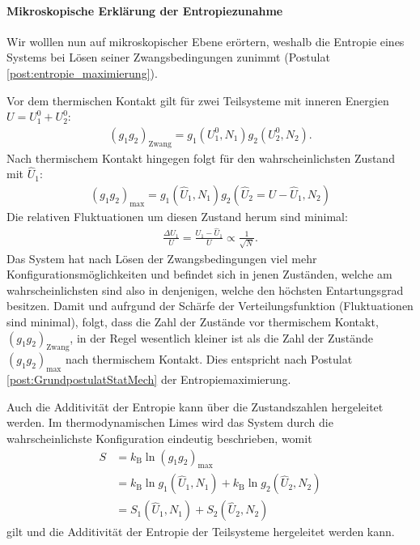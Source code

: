 \paragraph*{Mikroskopische Erklärung der Entropiezunahme}
Wir wolllen nun auf mikroskopischer Ebene erörtern, weshalb die Entropie eines Systems bei Lösen seiner Zwangsbedingungen zunimmt (Postulat \ref{post:entropie_maximierung}).

Vor dem thermischen Kontakt gilt für zwei Teilsysteme mit inneren Energien $U=U^0_1+U^0_2$:
\begin{align*}
    (g_1g_2)_\mathrm{Zwang}=g_1(U^0_1,N_1)g_2(U^0_2,N_2).
\end{align*}
Nach thermischem Kontakt hingegen folgt für den wahrscheinlichsten Zustand mit $\hat{U}_1$:
\begin{align*}
    (g_1g_2)_\mathrm{max}=g_1(\hat{U}_1,N_1)g_2(\hat{U}_2=U-\hat{U}_1,N_2)
\end{align*}
Die relativen Fluktuationen um diesen Zustand herum sind minimal:
\begin{align*}
    \frac{\Delta U_1}{U}=\frac{U_1-\hat{U}_1}{U}\propto \frac{1}{\sqrt{N}}.
\end{align*}
Das System hat nach Lösen der Zwangsbedingungen viel mehr Konfigurationsmöglichkeiten und befindet sich in jenen Zuständen, welche am wahrscheinlichsten sind \textendash{} also in denjenigen, welche den höchsten Entartungsgrad besitzen. Damit und aufrgund der Schärfe der Verteilungsfunktion (Fluktuationen sind minimal), folgt, dass die Zahl der Zustände vor thermischem Kontakt, $(g_1g_2)_\mathrm{Zwang}$, in der Regel wesentlich kleiner ist als die Zahl der Zustände $(g_1g_2)_\mathrm{max}$ nach thermischem Kontakt. Dies entspricht nach Postulat \ref{post:GrundpostulatStatMech} der Entropiemaximierung.

Auch die Additivität der Entropie kann über die Zustandszahlen hergeleitet werden. Im thermodynamischen Limes wird das System durch die wahrscheinlichste Konfiguration eindeutig beschrieben, womit 
\begin{align*}
    S&=k_\mathrm{B}\ln (g_1g_2)_\mathrm{max}\\
    &=k_\mathrm{B}\ln g_1(\hat{U}_1,N_1)+k_\mathrm{B}\ln g_2(\hat{U}_2,N_2)\\
    &=S_1(\hat{U}_1,N_1)+S_2(\hat{U}_2,N_2)
\end{align*}
gilt und die Additivität der Entropie der Teilsysteme hergeleitet werden kann.

